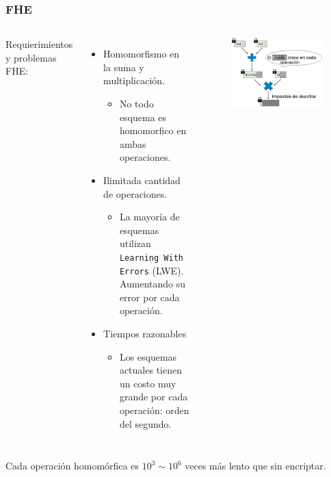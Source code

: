 \documentclass[handout]{beamer}
\begin{document}






\begin{frame}
\frametitle{FHE}
\begin{columns}
    Requierimientos y problemas FHE:
\begin{itemize}
  \item[\textcolor{frenchblue}{\textbullet}] Homomorfismo en la suma y multiplicación.
    \begin{itemize}
      \item[\textcolor{red}{\textbullet}]  No todo esquema es homomorfico en ambas operaciones.
    \end{itemize}
  \item[\textcolor{frenchblue}{\textbullet}] Ilimitada cantidad de operaciones.
    \begin{itemize}
      \item[\textcolor{red}{\textbullet}]  La mayoría de esquemas utilizan \texttt{Learning With Errors} (LWE). Aumentando su error por cada operación.
    \end{itemize}
  \item[\textcolor{frenchblue}{\textbullet}] Tiempos razonables
    \begin{itemize}
      \item[\textcolor{red}{\textbullet}]  Los esquemas actuales tienen un costo muy grande por cada operación: orden del segundo.
    \end{itemize}
\end{itemize}
        \begin{figure}[h!]
            \centering
            \includegraphics[scale=0.2]{multNoise.jpg}
        \end{figure}

\end{columns}
        Cada operación homomórfica es $10^3 \sim 10^6$ veces más lento que sin  encriptar.


\end{frame}
\end{document}
